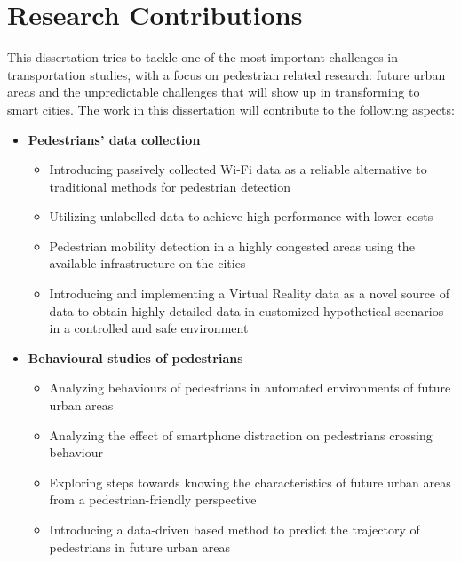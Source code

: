 \section{Research Contributions}
This dissertation tries to tackle one of the most important challenges in transportation studies, with a focus on pedestrian related research: future urban areas and the unpredictable challenges that will show up in transforming to smart cities. The work in this dissertation will contribute to the following aspects:


\begin{itemize}
    \item \textbf{Pedestrians' data collection}
    \begin{itemize}
         \item Introducing passively collected Wi-Fi data as a reliable alternative to traditional methods for pedestrian detection
         \item Utilizing unlabelled data to achieve high performance with lower costs
         \item Pedestrian mobility detection in a highly congested areas using the available infrastructure on the cities
         \item Introducing and implementing a Virtual Reality data as a novel source of data to obtain highly detailed data in customized hypothetical scenarios in a controlled and safe environment
    \end{itemize}
\end{itemize}

\begin{itemize}
    \item \textbf{Behavioural studies of pedestrians}
    \begin{itemize}
    \item Analyzing behaviours of pedestrians in automated environments of future urban areas
    \item Analyzing the effect of smartphone distraction on pedestrians crossing behaviour
    \item Exploring steps towards knowing the characteristics of future urban areas from a pedestrian-friendly perspective
    \item Introducing a data-driven based method to predict the trajectory of pedestrians in future urban areas
\end{itemize}
\end{itemize}

